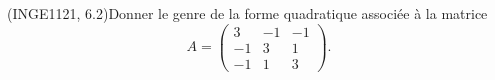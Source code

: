 

\begin{exercice}\label{exoINGE1121La0013}

	(INGE1121, 6.2)Donner le genre de la forme quadratique associée à la matrice
	\begin{equation}
		A=\begin{pmatrix}
			3	&	-1	&	-1	\\
			-1	&	3	&	1	\\
			-1	&	1	&	3
		\end{pmatrix}.
	\end{equation}

\end{exercice}
